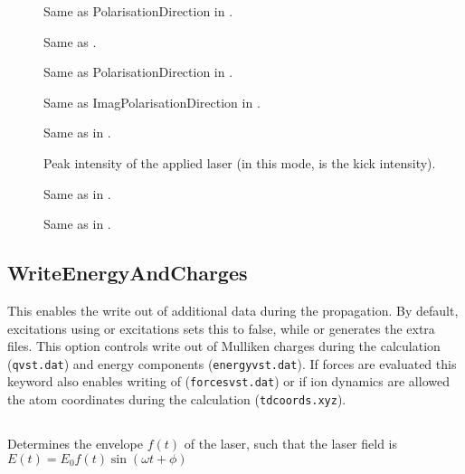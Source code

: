 \begin{description}
 \item[] Same as PolarisationDirection in .

 \item[] Same as .

 \item[] Same as PolarisationDirection in .

 \item[] Same as ImagPolarisationDirection in .

 \item[]  Same as in .

 \item[] Peak intensity of the applied laser (in
   this mode,  is the kick intensity).

 \item[] Same as in .

 \item[] Same as in .
\end{description}

\subsection{WriteEnergyAndCharges}
\label{sec:dftbp.tdextra}

This enables the write out of additional data during the propagation. By
default, excitations using  or  excitations sets this
to false, while  or  generates the extra files. This option
controls write out of Mulliken charges during the calculation (\verb|qvst.dat|)
and energy components (\verb|energyvst.dat|). If forces are evaluated this
keyword also enables writing of (\verb|forcesvst.dat|) or if ion dynamics are
allowed the atom coordinates during the calculation (\verb|tdcoords.xyz|).

\subsection{}
\label{sec:dftbp.envelope}

Determines the envelope $f(t)$ of the laser, such that the laser field
is $E(t) = E_0 f(t) \sin(\omega t + \phi) $

\paragraph{}

